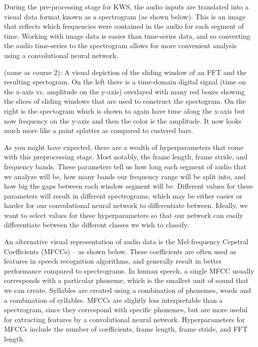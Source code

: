 {    During the pre-processing stage for KWS, the audio inputs are translated into a visual data format known as a spectrogram (as shown below). This is an image that reflects which frequencies were contained in the audio for each segment of time. Working with image data is easier than time-series data, and so converting the audio time-series to the spectrogram allows for more convenient analysis using a convolutional neural network.
    

    (same as course 2): A visual depiction of the sliding window of an FFT and the resulting spectogram. On the left there is a time-domain digital signal (time on the x-axis vs. amplitude on the y-axis) overlayed with many red boxes showing the slices of sliding windows that are used to construct the spectogram. On the right is the spectogram which is shown to again have time along the x-axis but now frequency on the y-axis and then the color is the amplitude. It now looks much more like a paint splatter as compared to custered bars.
    
    As you might have expected, there are a wealth of hyperparameters that come with this preprocessing stage. Most notably, the frame length, frame stride, and frequency bands. These parameters tell us how long each segment of audio that we analyze will be, how many bands our frequency range will be split into, and how big the gaps between each window segment will be. Different values for these parameters will result in different spectrograms, which may be either easier or harder for our convolutional neural network to differentiate between. Ideally, we want to select values for these hyperparameters so that our network can easily differentiate between the different classes we wish to classify.
    
    An alternative visual representation of audio data is the Mel-frequency Cepstral Coefficients (MFCCs) – as shown below. These coefficients are often used as features in speech recognition algorithms, and generally result in better performance compared to spectrograms. In human speech, a single MFCC usually corresponds with a particular phoneme, which is the smallest unit of sound that we can create. Syllables are created using a combination of phonemes, words and a combination of syllables. MFCCs are slightly less interpretable than a spectrogram, since they correspond with specific phonemes, but are more useful for extracting features by a convolutional neural network. Hyperparameters for MFCCs include the number of coefficients, frame length, frame stride, and FFT length.
    
}
